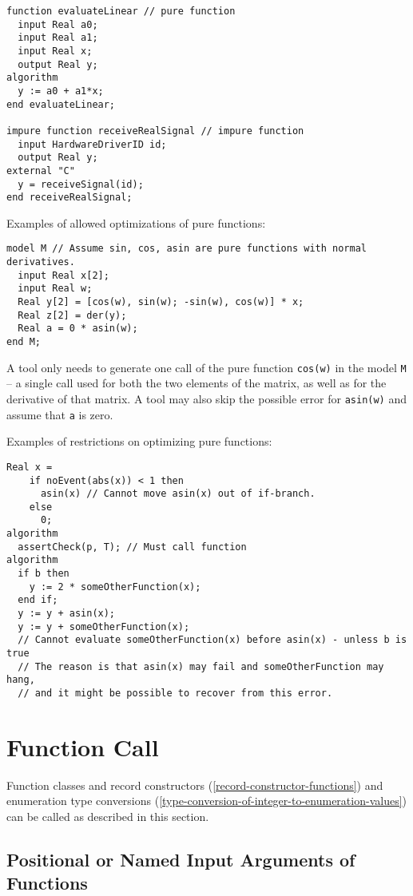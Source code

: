 \begin{example}
\begin{lstlisting}[language=modelica]
function evaluateLinear // pure function
  input Real a0;
  input Real a1;
  input Real x;
  output Real y;
algorithm
  y := a0 + a1*x;
end evaluateLinear;

impure function receiveRealSignal // impure function
  input HardwareDriverID id;
  output Real y;
external "C"
  y = receiveSignal(id);
end receiveRealSignal;
\end{lstlisting}
Examples of allowed optimizations of pure functions:
\begin{lstlisting}[language=modelica]
model M // Assume sin, cos, asin are pure functions with normal derivatives.
  input Real x[2];
  input Real w;
  Real y[2] = [cos(w), sin(w); -sin(w), cos(w)] * x;
  Real z[2] = der(y);
  Real a = 0 * asin(w);
end M;
\end{lstlisting}
A tool only needs to generate one call of the pure function \lstinline!cos(w)! in the model \lstinline!M! -- a single call used for both the two elements of the matrix, as well as for the derivative
of that matrix.  A tool may also skip the possible error for \lstinline!asin(w)! and assume that \lstinline!a! is zero.

Examples of restrictions on optimizing pure functions:
\begin{lstlisting}[language=modelica]
  Real x =
    if noEvent(abs(x)) < 1 then
      asin(x) // Cannot move asin(x) out of if-branch.
    else
      0;
algorithm
  assertCheck(p, T); // Must call function
algorithm
  if b then
    y := 2 * someOtherFunction(x);
  end if;
  y := y + asin(x);
  y := y + someOtherFunction(x);
  // Cannot evaluate someOtherFunction(x) before asin(x) - unless b is true
  // The reason is that asin(x) may fail and someOtherFunction may hang,
  // and it might be possible to recover from this error.
\end{lstlisting}
\end{example}

\section{Function Call}\label{function-call}

Function classes and record constructors (\cref{record-constructor-functions}) and enumeration type
conversions (\cref{type-conversion-of-integer-to-enumeration-values}) can be called as described in this section.

\subsection{Positional or Named Input Arguments of Functions}\label{positional-or-named-input-arguments-of-functions}

